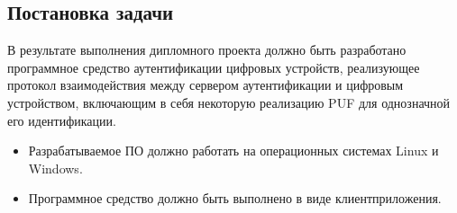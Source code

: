 \subsection{Постановка задачи}
В результате выполнения дипломного проекта должно быть разработано программное средство аутентификации цифровых устройств, реализующее протокол взаимодействия между сервером аутентификации и цифровым устройством, включающим в себя некоторую реализацию PUF для однозначной его идентификации.
\begin{itemize}
\item Разрабатываемое ПО должно работать на операционных системах Linux и Windows.
\item Программное средство должно быть выполнено в виде клиент приложения.
\end{itemize}
